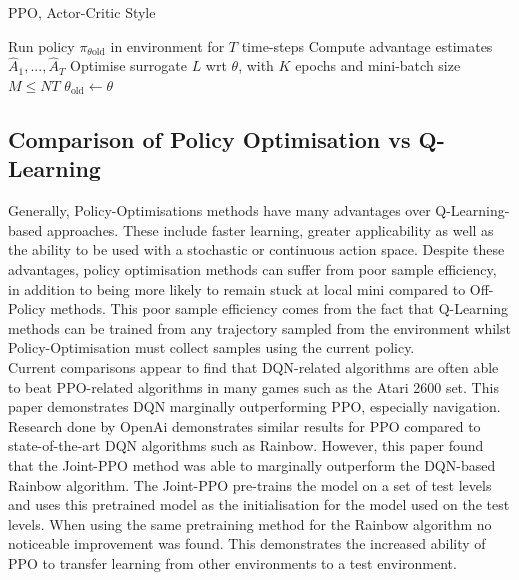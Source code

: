 \documentclass{article}
\begin{document}
\begin{algorithm}
\caption{PPO, Actor-Critic Style \cite{Schulman2017ProximalAlgorithms}}\label{alg:PPO}
\begin{algorithmic}

        \State Run policy $\pi_{\theta \text{old}}$ in environment for $T$ time-steps
        \State Compute advantage estimates $\hat{A}_1,...,\hat{A}_T$
    \EndFor
    \State Optimise surrogate $L$ wrt $\theta$, with $K$ epochs and mini-batch size $M \le NT$
    \State $\theta_{\text{old}} \leftarrow \theta$
\EndFor

\end{algorithmic}
\end{algorithm}

\subsection{Comparison of Policy Optimisation vs Q-Learning}

Generally, Policy-Optimisations methods have many advantages over Q-Learning-based approaches. These include faster learning, greater applicability as well as the ability to be used with a stochastic or continuous action space\cite{NachumBridgingLearning}. Despite these advantages, policy optimisation methods can suffer from poor sample efficiency\cite{NachumBridgingLearning}, in addition to being more likely to remain stuck at local mini compared to Off-Policy methods. This poor sample efficiency comes from the fact that Q-Learning methods can be trained from any trajectory sampled from the environment whilst Policy-Optimisation must collect samples using the current policy. 
\\ 
Current comparisons appear to find that DQN-related algorithms are often able to beat PPO-related algorithms in many games such as the Atari 2600 set. This paper\cite{Zakharenkov2021DeepVizDoom} demonstrates DQN marginally outperforming PPO, especially navigation. Research done by OpenAi demonstrates similar results for PPO compared to state-of-the-art DQN algorithms such as Rainbow\cite{NicholGottaRL}. However, this paper found that the Joint-PPO method was able to marginally outperform the DQN-based Rainbow algorithm. The Joint-PPO pre-trains the model on a set of test levels and uses this pretrained model as the initialisation for the model used on the test levels. When using the same pretraining method for the Rainbow algorithm no noticeable improvement was found. This demonstrates the increased ability of PPO to transfer learning from other environments to a test environment. 
\end{document}

